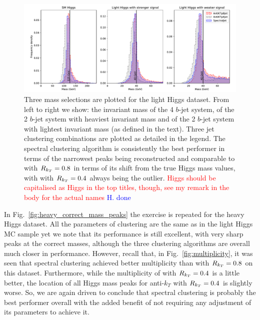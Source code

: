 \begin{figure}[htp]
    \includegraphics[width=1.\textwidth]{graphics/mass_peaks/light_long_correct_lines}
    \caption{Three mass selections are plotted for the light Higgs dataset. From left to right we show: the invariant mass of the 4 $b$-jet system, of the 2 $b$-jet system with heaviest invariant mass and of the 2 $b$-jet system with lightest invariant mass (as defined in the text).   Three jet clustering combinations are plotted as detailed in the legend.
        The spectral clustering algorithm is consistently the best performer in terms of the narrowest peaks being reconstructed and comparable to \antikt{} with \(R_{k_T}{} = 0.8\) in terms of its shift from the true Higgs mass values, with \antikt{} with \(R_{k_T}{} = 0.4\) always being the outlier. 
{\textcolor{red}{Higgs should be capitalised as Higgs in the top titles, though, see my remark in the body for the actual names} \textcolor{blue}{H. done}}
    }\label{fig:best_correct_h_allocation}
\end{figure}    

In 
Fig.~\ref{fig:heavy_correct_mass_peaks} the exercise is repeated for the heavy Higgs dataset.
All the parameters of \spectral{} clustering are the same as in the light Higgs MC sample yet we note that 
its performance is still excellent, with very sharp peaks at the correct masses, although the three clustering algorithms are overall much closer in performance.
However, recall that, in Fig.~\ref{fig:multiplicity},
it was seen that spectral clustering achieved better multiplicity than \antikt{} with \(R_{k_T}{} = 0.8\) on this dataset. Furthermore, 
while the multiplicity of \antikt{} with \(R_{k_T}{} = 0.4\) is a little better, the location of all Higgs mass peaks for anti-$k_T$ with 
\(R_{k_T} = 0.4\) is slightly worse. So, we are again driven to conclude that spectral clustering is probably the best performer overall with the added benefit of not requiring any adjustment of its parameters to achieve it. 

